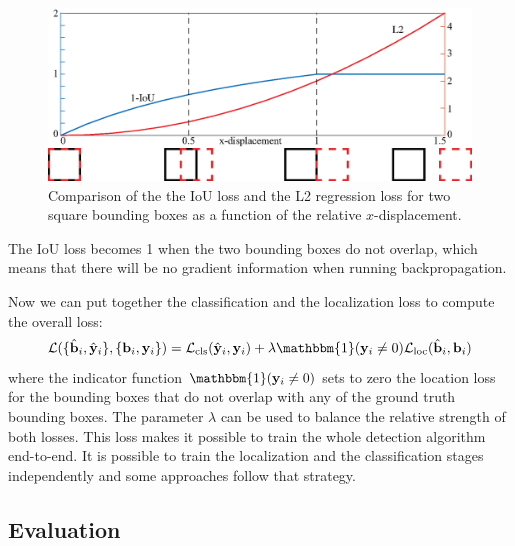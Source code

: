 \begin{figure}
\centerline{
\includegraphics[width=.9\linewidth]{figures/object_recognition/iou_l2_comparison.eps}
}
\caption{Comparison of the the IoU loss and the L2 regression loss for two square bounding boxes as a function of the relative $x$-displacement.}
\label{fig:iou_l2_comparison}
\end{figure}

The IoU loss becomes 1 when the two bounding boxes do not overlap, which means that there will be no gradient information when running backpropagation. 

Now we can put together the classification and the localization loss to compute the overall loss:
\begin{equation}
    \mathcal{L}( \{\hat{\mathbf{b}}_i, \hat{\mathbf{y}}_i\}, \{\mathbf{b}_i, \mathbf{y}_i\})
     =  \mathcal{L}_{\text{cls}}(\hat{\mathbf{y}}_i, \mathbf{y}_i) +
     \lambda \mathbbm{1} (\mathbf{y}_i \neq 0)
     \mathcal{L}_{\text{loc}} 
     (\hat{\mathbf{b}}_i, \mathbf{b}_i)
\end{equation}
where the indicator function $\mathbbm{1} (\mathbf{y}_i \neq 0)$ sets to zero the location loss for the bounding boxes that do not overlap with any of the ground truth bounding boxes. The parameter $\lambda$ can be used to balance the relative strength of both losses. This loss makes it possible to train the whole detection algorithm end-to-end. It is possible to train the localization and the classification stages independently and some approaches follow that strategy. 



\subsection{Evaluation}

